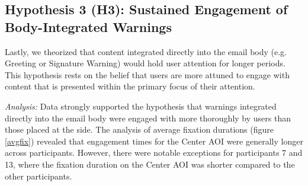 \documentclass[
  a4paper,  %
  twoside,  %
  bibliography=totoc,
  headsepline,
  cleardoublepage=empty,
  parskip=half,
  draft=false
]{scrbook}
\begin{document}

\subsection{Hypothesis 3 (H3): Sustained Engagement of Body-Integrated Warnings}
Lastly, we theorized that content integrated directly into the email body (e.g. Greeting or Signature Warning) would hold user attention for longer periods. This hypothesis rests on the belief that users are more attuned to engage with content that is presented within the primary focus of their attention.

\textit{Analysis:} 
Data strongly supported the hypothesis that warnings integrated directly into the email body were engaged with more thoroughly by users than those placed at the side. The analysis of average fixation durations (figure \ref{avgfix}) revealed that engagement times for the Center AOI were generally longer across participants. However, there were notable exceptions for participants 7 and 13, where the fixation duration on the Center AOI was shorter compared to the other participants. 
\end{document}
